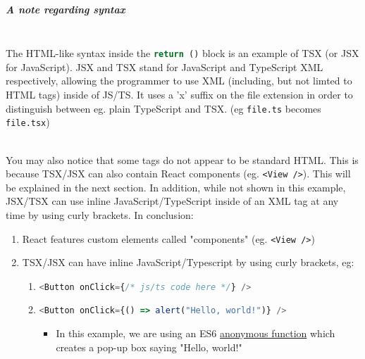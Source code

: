 \documentclass[../../main.tex]{subfiles}
\begin{document}
\subparagraph{A note regarding syntax\\}

\noindent \\ The HTML-like syntax inside the
\lstinline[language=typescript]{return ()} block is an example
of TSX (or JSX for JavaScript). JSX and TSX stand for JavaScript
and TypeScript XML respectively, allowing the programmer
to use XML (including, but not limted to HTML tags) inside of JS/TS.
It uses a 'x' suffix on the file extension in order
to distinguish between eg. plain TypeScript and TSX.
(eg \lstinline{file.ts} becomes \lstinline{file.tsx})

\noindent \\ You may also notice that some tags do not
appear to be standard HTML. This is because TSX/JSX can also contain
React components (eg. \lstinline[language=tsx]{<View />}).
This will be explained in the next section.
In addition, while not shown in this example, JSX/TSX
can use inline JavaScript/TypeScript inside of an XML tag at any time
by using curly brackets. In conclusion:


\begin{enumerate}
  \item React features custom elements called "components" (eg. \lstinline[language=tsx]{<View />})
  \item TSX/JSX can have inline JavaScript/Typescript by using curly brackets, eg:
        \begin{enumerate}
          \item \lstinline[language=typescript]|<Button onClick={/* js/ts code here */} />|
          \item \lstinline[language=typescript]|<Button onClick={() => alert("Hello, world!")} />|
                \begin{itemize}
                  \item[\labelitemi] In this example, we are using an
                        ES6 \underline{anonymous function} which creates
                        a pop-up box saying "Hello, world!"
                \end{itemize}
        \end{enumerate}
\end{enumerate}

\end{document}
